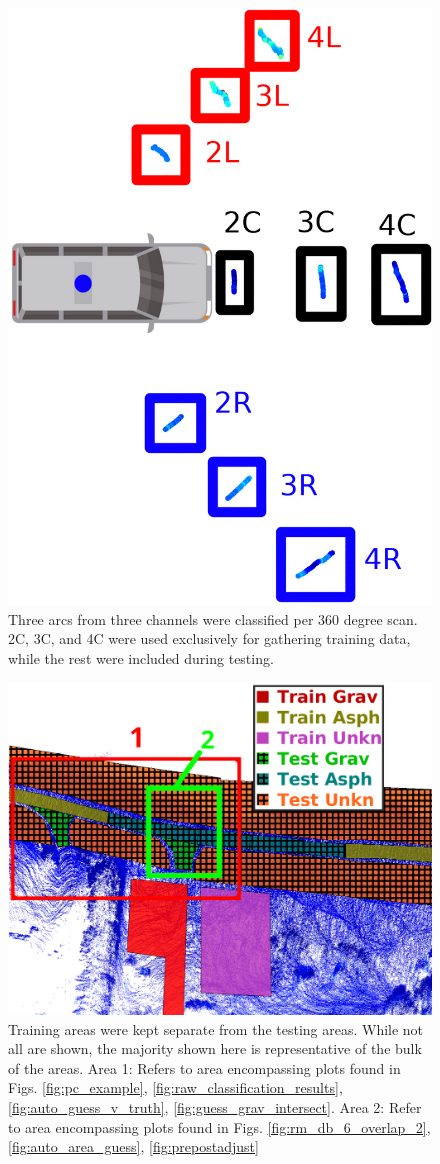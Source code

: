 \documentclass[journal,onecolumn]{IEEEtran}
\begin{document}
			\begin{figure}[H]
				\centering
				\includegraphics[width=0.25\linewidth]{figures/nine_arcs_example}
				\caption[Areas to Classify]{Three arcs from three channels were classified per 360 degree scan. 2C, 3C, and 4C were used exclusively for gathering training data, while the rest were included during testing. }
				\label{fig:nine_arcs_example}
			\end{figure}
		
			\begin{figure}[H]
				\centering
				\includegraphics[width=0.95\linewidth]{figures/test_vs_train_areas_hatch_annotated}
				\caption[Training vs Testing Areas]{Training areas were kept separate from the testing areas. While not all are shown, the majority shown here is representative of the bulk of the areas. Area 1: Refers to area encompassing plots found in Figs. \ref{fig:pc_example}, \ref{fig:raw_classification_results}, \ref{fig:auto_guess_v_truth}, \ref{fig:guess_grav_intersect}. Area 2: Refer to area encompassing plots found in Figs. \ref{fig:rm_db_6_overlap_2}, \ref{fig:auto_area_guess}, \ref{fig:prepostadjust}    
				}
				\label{fig:test_vs_train_areas}
			\end{figure}
			
\end{document}
